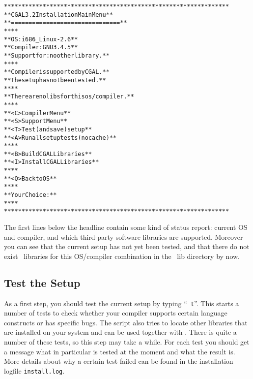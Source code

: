 {\ccTexHtml{\scriptsize}{} \label{pic:main-menu}
\begin{alltt}
  ****************************************************************
  **             CGAL 3.2 Installation Main Menu                **
  **             ===============================                **
  **                                                            **
  **   OS:          i686_Linux-2.6                              **
  **   Compiler:    GNU 3.4.5                                   **
  **   Support for: no other library.                           **
  **                                                            **
  **   Compiler is supported by CGAL.                           **
  **   The setup has not been tested.                           **
  **                                                            **
  **   There are no libs for this os/compiler.                  **
  **                                                            **
  **   <C>  Compiler Menu                                       **
  **   <S>  Support Menu                                        **
  **   <T>  Test (and save) setup                               **
  **   <A>  Run all setup tests (no cache)                      **
  **                                                            **
  **   <B>  Build CGAL Libraries                                **
  **   <I>  Install CGAL Libraries                              **
  **                                                            **
  **   <Q>  Back to OS                                          **
  **                                                            **
  **   Your Choice:                                             **
  **                                                            **
  ****************************************************************
\end{alltt}}

The first lines below the headline contain some kind of status report:
current OS and compiler, and which third-party software libraries are
supported. Moreover you can see that the current setup has not yet
been tested, and that there do not exist \cgal\ libraries for this
OS/compiler combination in the \cgal\ lib directory by now.

\subsection{Test the Setup\label{sec:test-the-setup}}

As a first step, you should test the current setup by typing ``{\tt
  t}''. This starts a number of tests to check whether your compiler
supports certain language constructs or has specific bugs.  The script
also tries to locate other libraries that are installed on your system
and can be used together with \cgal. There is quite a number of these
tests, so this step may take a while.  For each test you should get a
message what in particular is tested at the moment and what the result
is. More details about why a certain test failed can be found in the
installation logfile \texttt{install.log}.

